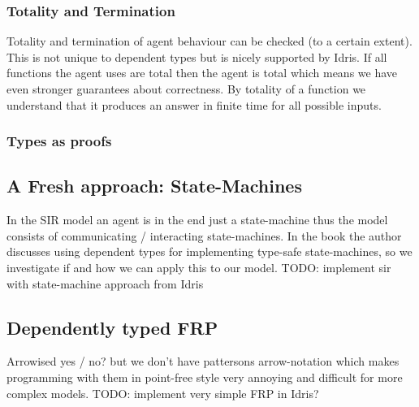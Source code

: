 \subsubsection{Totality and Termination}
Totality and termination of agent behaviour can be checked (to a certain extent). This is not unique to dependent types but is nicely supported by Idris. If all functions the agent uses are total then the agent is total which means we have even stronger guarantees about correctness. By totality of a function we understand that it produces an answer in finite time for all possible inputs.

\subsubsection{Types as proofs}



\subsection{A Fresh approach: State-Machines}
In the SIR model an agent is in the end just a state-machine thus the model consists of communicating / interacting state-machines. In the book \cite{brady_type-driven_2017} the author discusses using dependent types for implementing type-safe state-machines, so we investigate if and how we can apply this to our model.
TODO: implement sir with state-machine approach from Idris

\subsection{Dependently typed FRP}
Arrowised yes / no? but we don't have pattersons arrow-notation which makes programming with them in point-free style very annoying and difficult for more complex models.
TODO: implement very simple FRP in Idris?